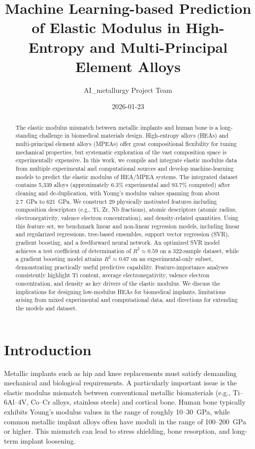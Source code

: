 \documentclass[11pt,a4paper]{article}
\title{Machine Learning-based Prediction of Elastic Modulus in High-Entropy and Multi-Principal Element Alloys}
\author{AI\_metallurgy Project Team}
\date{2026-01-23}
\begin{document}
\maketitle

\begin{abstract}
The elastic modulus mismatch between metallic implants and human bone is a long-standing challenge in biomedical materials design. High-entropy alloys (HEAs) and multi-principal element alloys (MPEAs) offer great compositional flexibility for tuning mechanical properties, but systematic exploration of the vast composition space is experimentally expensive. In this work, we compile and integrate elastic modulus data from multiple experimental and computational sources and develop machine-learning models to predict the elastic modulus of HEA/MPEA systems. The integrated dataset contains 5{,}339 alloys (approximately 6.3\% experimental and 93.7\% computed) after cleaning and de-duplication, with Young's modulus values spanning from about 2.7~GPa to 621~GPa. We construct 29 physically motivated features including composition descriptors (e.g., Ti, Zr, Nb fractions), atomic descriptors (atomic radius, electronegativity, valence electron concentration), and density-related quantities. Using this feature set, we benchmark linear and non-linear regression models, including linear and regularized regressions, tree-based ensembles, support vector regression (SVR), gradient boosting, and a feedforward neural network. An optimized SVR model achieves a test coefficient of determination of $R^2 \approx 0.59$ on a 322-sample dataset, while a gradient boosting model attains $R^2 \approx 0.67$ on an experimental-only subset, demonstrating practically useful predictive capability. Feature-importance analyses consistently highlight Ti content, average electronegativity, valence electron concentration, and density as key drivers of the elastic modulus. We discuss the implications for designing low-modulus HEAs for biomedical implants, limitations arising from mixed experimental and computational data, and directions for extending the models and dataset.
\end{abstract}

\section{Introduction}

Metallic implants such as hip and knee replacements must satisfy demanding mechanical and biological requirements. A particularly important issue is the elastic modulus mismatch between conventional metallic biomaterials (e.g., Ti--6Al--4V, Co--Cr alloys, stainless steels) and cortical bone. Human bone typically exhibits Young's modulus values in the range of roughly 10--30~GPa, while common metallic implant alloys often have moduli in the range of 100--200~GPa or higher. This mismatch can lead to stress shielding, bone resorption, and long-term implant loosening.
\end{document}
